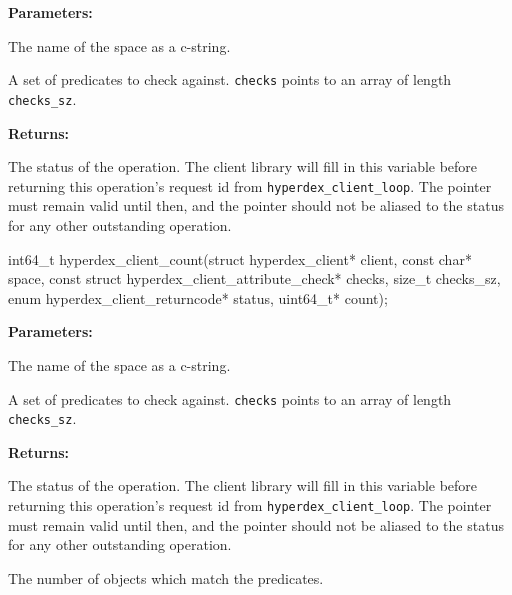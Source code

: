 \noindent\textbf{Parameters:}
\begin{description}[labelindent=\widthof{{\texttt{checks}, \texttt{checks\_sz}}},leftmargin=*,noitemsep,nolistsep,align=right]
\item[\texttt{space}] The name of the space as a c-string.
\item[\texttt{checks}, \texttt{checks\_sz}] A set of predicates to check against.  \texttt{checks} points to an array of length \texttt{checks\_sz}.
\end{description}

\noindent\textbf{Returns:}
\begin{description}[labelindent=\widthof{{\texttt{status}}},leftmargin=*,noitemsep,nolistsep,align=right]
\item[\texttt{status}] The status of the operation.  The client library will fill in this variable before returning this operation's request id from \texttt{hyperdex\_client\_loop}.  The pointer must remain valid until then, and the pointer should not be aliased to the status for any other outstanding operation.
\end{description}

\funcsep
\begin{ccode}
int64_t hyperdex_client_count(struct hyperdex_client* client,
                const char* space,
                const struct hyperdex_client_attribute_check* checks, size_t checks_sz,
                enum hyperdex_client_returncode* status,
                uint64_t* count);
\end{ccode}
\funcdesc 

\noindent\textbf{Parameters:}
\begin{description}[labelindent=\widthof{{\texttt{checks}, \texttt{checks\_sz}}},leftmargin=*,noitemsep,nolistsep,align=right]
\item[\texttt{space}] The name of the space as a c-string.
\item[\texttt{checks}, \texttt{checks\_sz}] A set of predicates to check against.  \texttt{checks} points to an array of length \texttt{checks\_sz}.
\end{description}

\noindent\textbf{Returns:}
\begin{description}[labelindent=\widthof{{\texttt{status}}},leftmargin=*,noitemsep,nolistsep,align=right]
\item[\texttt{status}] The status of the operation.  The client library will fill in this variable before returning this operation's request id from \texttt{hyperdex\_client\_loop}.  The pointer must remain valid until then, and the pointer should not be aliased to the status for any other outstanding operation.
\item[\texttt{count}] The number of objects which match the predicates.
\end{description}
